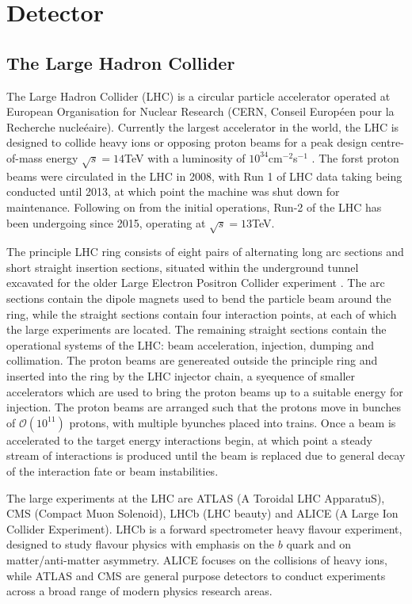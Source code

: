 \chapter{Detector}\label{c:Det}

\section{The Large Hadron Collider}

	The Large Hadron Collider (LHC) is a circular particle accelerator operated at European Organisation for Nuclear Research (CERN, Conseil Europ\'{e}en pour la Recherche nucle\'{e}aire). Currently the largest accelerator in the world, the LHC is designed to collide heavy ions or opposing proton beams for a peak design centre-of-mass energy $\sqrt{s}=14$TeV with a luminosity of $10^{34}$cm$^{-2}$s$^{-1}$ \cite{lhc}. The forst proton beams were circulated in the LHC in 2008, with Run 1 of LHC data taking being conducted until 2013, at which point the machine was shut down for maintenance. Following on from the initial operations, Run-2 of the LHC has been undergoing since 2015, operating at $\sqrt{s}=13$TeV. 
	
	The principle LHC ring consists of eight pairs of alternating long arc sections and short straight insertion sections, situated within the underground tunnel excavated for the older Large Electron Positron Collider experiment \cite{lep1, lep2}. The arc sections contain the dipole magnets used to bend the particle beam around the ring, while the straight sections contain four interaction points, at each of which the large experiments are located. The remaining straight sections contain the operational systems of the LHC: beam acceleration, injection,  dumping and collimation. The proton beams are genereated outside the principle ring and inserted into the ring by the LHC injector chain, a syequence of smaller accelerators which are used to bring the proton beams up to a suitable energy for injection. The proton beams are arranged such that the protons move in bunches of $\mathcal{O}(10^{11})$ protons, with multiple byunches placed into trains. Once a beam is accelerated to the target energy interactions begin, at which point a steady stream of interactions is produced until the beam is replaced due to general decay of the interaction fate or beam instabilities.
	
	The large experiments at the LHC are ATLAS (A Toroidal LHC ApparatuS), CMS (Compact Muon Solenoid), LHCb (LHC beauty) and ALICE (A Large Ion Collider Experiment). LHCb is a forward spectrometer heavy flavour experiment, designed to study flavour physics with emphasis on the $b$ quark and on matter/anti-matter asymmetry. ALICE focuses on the collisions of heavy ions, while ATLAS and CMS are general purpose detectors to conduct experiments across a broad range of modern physics research areas.
	
